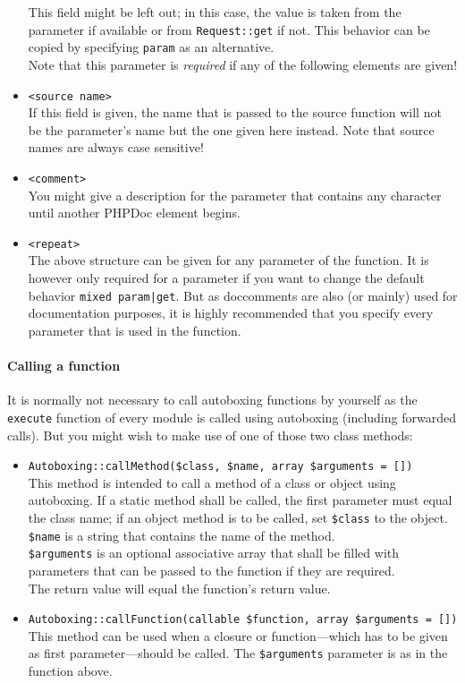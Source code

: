 \documentclass{scrartcl}
\begin{document}
\begin{itemize}
            This field might be left out; in this case, the value is taken from the parameter if available or from \lstinline!Request::get! if not. This behavior can be copied by specifying \texttt{param} as an alternative. \\
            Note that this parameter is \emph{required} if any of the following elements are given!
         \item \texttt{<source name>} \\
            If this field is given, the name that is passed to the source function will not be the parameter's name but the one given here instead. Note that source names are always case sensitive!
         \item \texttt{<comment>} \\
            You might give a description for the parameter that contains any character until another PHPDoc element begins.
         \item \texttt{<repeat>} \\
            The above structure can be given for any parameter of the function. It is however only required for a parameter if you want to change the default behavior \texttt{mixed param|get}. But as doccomments are also (or mainly) used for documentation purposes, it is highly recommended that you specify every parameter that is used in the function.
      \end{itemize}
      \paragraph{Calling a function}
         It is normally not necessary to call autoboxing functions by yourself as the \lstinline!execute! function of every module is called using autoboxing (including forwarded calls). But you might wish to make use of one of those two class methods:
         \begin{itemize}
            \item \lstinline!Autoboxing::callMethod($class, $name, array $arguments = [])! \\
               This method is intended to call a method of a class or object using autoboxing. If a static method shall be called, the first parameter must equal the class name; if an object method is to be called, set \lstinline!$class! to the object. \\
               \lstinline!$name! is a string that contains the name of the method. \\
               \lstinline!$arguments! is an optional associative array that shall be filled with parameters that can be passed to the function if they are required. \\
               The return value will equal the function's return value.
            \item \lstinline!Autoboxing::callFunction(callable $function, array $arguments = [])! \\
               This method can be used when a closure or function---which has to be given as first parameter---should be called. The \lstinline!$arguments! parameter is as in the function above.
         \end{itemize}
\end{document}
